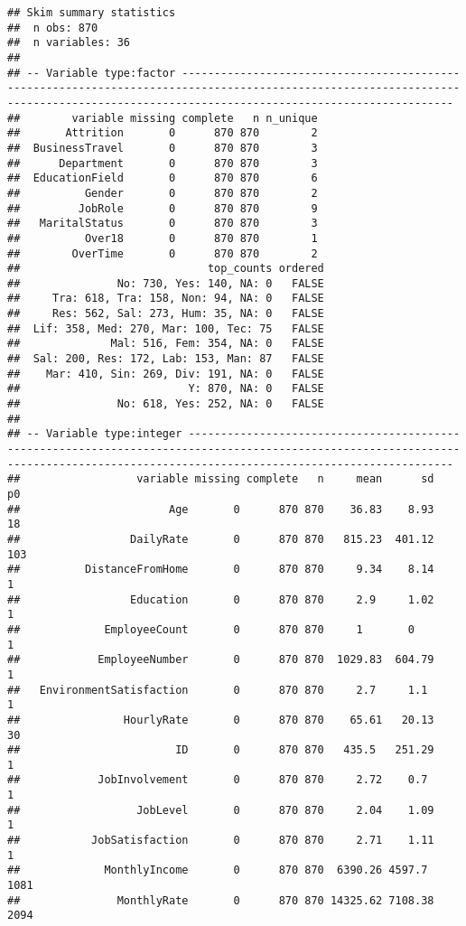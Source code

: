 \documentclass[]{article}
\begin{document}
\begin{verbatim}
## Skim summary statistics
##  n obs: 870 
##  n variables: 36 
## 
## -- Variable type:factor --------------------------------------------------------------------------------------------------------------------------------------------------------------------------------------
##        variable missing complete   n n_unique
##       Attrition       0      870 870        2
##  BusinessTravel       0      870 870        3
##      Department       0      870 870        3
##  EducationField       0      870 870        6
##          Gender       0      870 870        2
##         JobRole       0      870 870        9
##   MaritalStatus       0      870 870        3
##          Over18       0      870 870        1
##        OverTime       0      870 870        2
##                             top_counts ordered
##               No: 730, Yes: 140, NA: 0   FALSE
##     Tra: 618, Tra: 158, Non: 94, NA: 0   FALSE
##     Res: 562, Sal: 273, Hum: 35, NA: 0   FALSE
##  Lif: 358, Med: 270, Mar: 100, Tec: 75   FALSE
##              Mal: 516, Fem: 354, NA: 0   FALSE
##  Sal: 200, Res: 172, Lab: 153, Man: 87   FALSE
##    Mar: 410, Sin: 269, Div: 191, NA: 0   FALSE
##                          Y: 870, NA: 0   FALSE
##               No: 618, Yes: 252, NA: 0   FALSE
## 
## -- Variable type:integer -------------------------------------------------------------------------------------------------------------------------------------------------------------------------------------
##                  variable missing complete   n     mean      sd   p0
##                       Age       0      870 870    36.83    8.93   18
##                 DailyRate       0      870 870   815.23  401.12  103
##          DistanceFromHome       0      870 870     9.34    8.14    1
##                 Education       0      870 870     2.9     1.02    1
##             EmployeeCount       0      870 870     1       0       1
##            EmployeeNumber       0      870 870  1029.83  604.79    1
##   EnvironmentSatisfaction       0      870 870     2.7     1.1     1
##                HourlyRate       0      870 870    65.61   20.13   30
##                        ID       0      870 870   435.5   251.29    1
##            JobInvolvement       0      870 870     2.72    0.7     1
##                  JobLevel       0      870 870     2.04    1.09    1
##           JobSatisfaction       0      870 870     2.71    1.11    1
##             MonthlyIncome       0      870 870  6390.26 4597.7  1081
##               MonthlyRate       0      870 870 14325.62 7108.38 2094

\end{verbatim}
\end{document}
